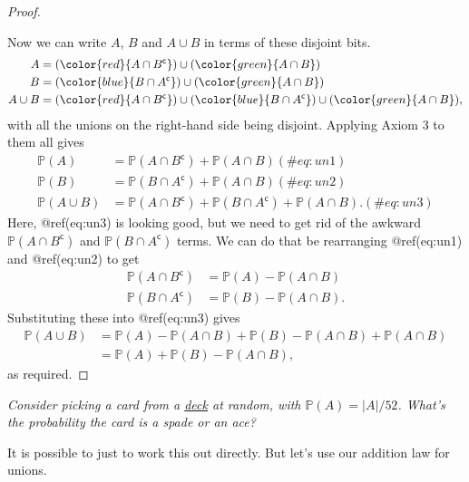 \documentclass[
  letterpaper,
  DIV=11,
  numbers=noendperiod]{scrreprt}
\theoremstyle{remark}
\begin{document}
\begin{proof}
\begin{figure}
{}

\end{figure}

Now we can write \(A\), \(B\) and \(A \cup B\) in terms of these
disjoint bits. \begin{align}
A &= (\color{red}{A \cap B^\mathsf{c}}) \cup (\color{green}{A \cap B}) \\
B &= (\color{blue}{B \cap A^\mathsf{c}}) \cup (\color{green}{A \cap B}) \\
A \cup B &= (\color{red}{A \cap B^\mathsf{c}}) \cup (\color{blue}{B \cap A^\mathsf{c}}) \cup (\color{green}{A \cap B}),
\end{align} with all the unions on the right-hand side being disjoint.
Applying Axiom 3 to them all gives \begin{align}
\mathbb P(A) &= \mathbb P(A \cap B^\mathsf{c}) + \mathbb P(A \cap B) (\#eq:un1)  \\
\mathbb P(B) &= \mathbb P(B \cap A^\mathsf{c}) + \mathbb P(A \cap B)  (\#eq:un2) \\
\mathbb P(A \cup B) &= \mathbb P(A \cap B^\mathsf{c}) + \mathbb P(B \cap A^\mathsf{c}) + \mathbb P(A \cap B) . (\#eq:un3)
\end{align} Here, @ref(eq:un3) is looking good, but we need to get rid
of the awkward \(\mathbb P(A \cap B^\mathsf{c})\) and
\(\mathbb P(B \cap A^\mathsf{c})\) terms. We can do that be rearranging
@ref(eq:un1) and @ref(eq:un2) to get \begin{align}
\mathbb P(A \cap B^\mathsf{c}) &= \mathbb P(A) - \mathbb P(A \cap B) \\
\mathbb P(B \cap A^\mathsf{c}) &= \mathbb P(B) - \mathbb P(A \cap B) .
\end{align} Substituting these into @ref(eq:un3) gives \begin{align}
\mathbb P(A \cup B) &= \mathbb P(A) - \mathbb P(A \cap B) + \mathbb P(B) - \mathbb P(A \cap B) + \mathbb P(A \cap B) \\
  &= \mathbb P(A)+ \mathbb P(B) - \mathbb P(A \cap B) ,
\end{align} as required.

\end{proof}

\emph{Consider picking a card from a
\href{https://en.wikipedia.org/wiki/Standard_52-card_deck}{deck} at
random, with \(\mathbb P(A) = |A|/52\). What's the probability the card
is a spade or an ace?}

It is possible to just to work this out directly. But let's use our
addition law for unions.
\end{document}
